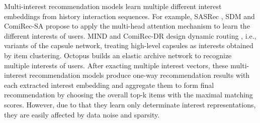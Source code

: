  Multi-interest recommendation models learn multiple different interest embeddings from history interaction sequences. For example, SASRec \cite{SASRec}, SDM \cite{lv_sdm_2019} and ComiRec-SA \cite{cen_controllable_2020} propose to apply the multi-head attention mechanism to learn the different interests of users. MIND \cite{MIND} and ComiRec-DR \cite{cen_controllable_2020} design dynamic routing \cite{sabour2017dynamic}, i.e., variants of the capsule network, treating high-level capsules as interests obtained by item clustering. Octopus \cite{liu_octopus_2020} builds an elastic archive network to recognize multiple interests of users. After exacting multiple interest vectors, these multi-interest recommendation models produce one-way recommendation results with each extracted interest embedding and aggregate them to form final recommendation by choosing the overall top-k items with the maximal matching scores. However, due to that they learn only determinate interest representations, they are easily affected by data noise and sparsity.